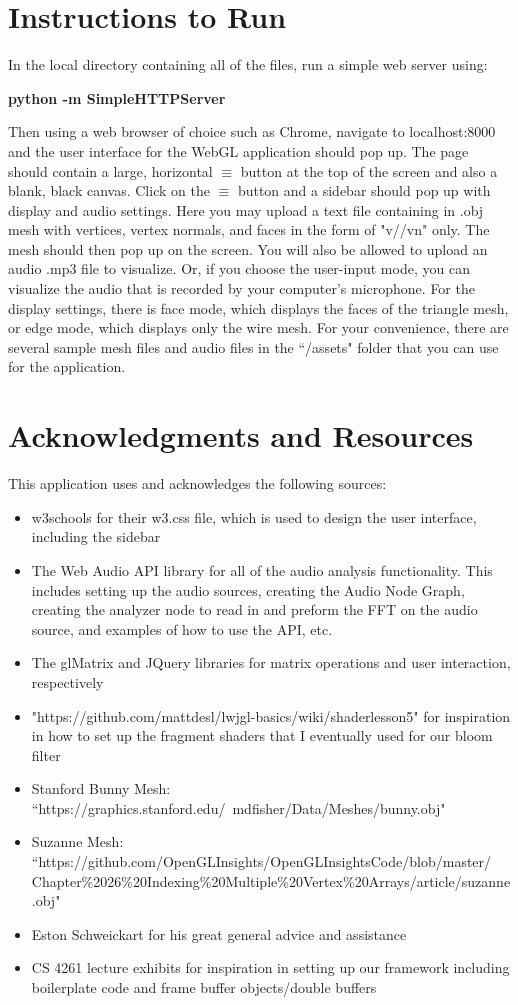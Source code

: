 \documentclass[12pt]{article}
\begin{document}
\section{Instructions to Run}
In the local directory containing all of the files, run a simple web server using:
\begin{center}
	\textbf{python -m SimpleHTTPServer}
\end{center}
Then using a web browser of choice such as Chrome, navigate to localhost:8000 and the user interface for the WebGL application should pop up. The page should contain a large, horizontal $\equiv$ button at the top of the screen and also a blank, black canvas. Click on the $\equiv$ button and a sidebar should pop up with display and audio settings. Here you may upload a text file containing in .obj mesh with vertices, vertex normals, and faces in the form of "v//vn" only. The mesh should then pop up on the screen. You will also be allowed to upload an audio .mp3 file to visualize. Or, if you choose the user-input mode, you can visualize the audio that is recorded by your computer's microphone. For the display settings, there is face mode, which displays the faces of the triangle mesh, or edge mode, which displays only the wire mesh. For your convenience, there are several sample mesh files and audio files in the ``/assets" folder that you can use for the application. 

\section{Acknowledgments and Resources}
This application uses and acknowledges the following sources:
\begin{itemize}
	\item w3schools for their w3.css file, which is used to design the user interface, including the sidebar
	\item The Web Audio API library for all of the audio analysis functionality. This includes setting up the audio sources, creating the Audio Node Graph, creating the analyzer node to read in and preform the FFT on the audio source, and examples of how to use the API, etc.
	\item The glMatrix and JQuery libraries for matrix operations and user interaction, respectively
	\item "https://github.com/mattdesl/lwjgl-basics/wiki/shaderlesson5" for inspiration in how to set up the fragment shaders that I eventually used for our bloom filter
	\item Stanford Bunny Mesh: ``https://graphics.stanford.edu/~mdfisher/Data/Meshes/bunny.obj"
	\item Suzanne Mesh: ``https://github.com/OpenGLInsights/OpenGLInsightsCode/blob/master/\\
	Chapter\%2026\%20Indexing\%20Multiple\%20Vertex\%20Arrays/article/suzanne.obj"
	\item Eston Schweickart for his great general advice and assistance
	\item CS 4261 lecture exhibits for inspiration in setting up our framework including boilerplate code and frame buffer objects/double buffers
\end{itemize}
\end{document}
